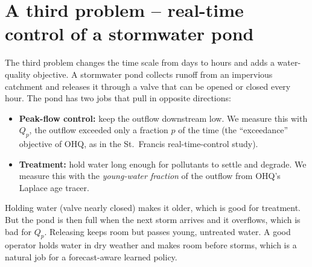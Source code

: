 \section{A third problem -- real-time control of a stormwater pond}\label{sec:pond}

The third problem changes the time scale from days to hours and adds a
water-quality objective. A stormwater pond collects runoff from an
impervious catchment and releases it through a valve that can be opened or
closed every hour. The pond has two jobs that pull in opposite directions:
\begin{itemize}\itemsep1pt
\item \textbf{Peak-flow control:} keep the outflow downstream low. We
measure this with $Q_p$, the outflow exceeded only a fraction $p$ of the
time (the ``exceedance'' objective of OHQ, as in the St.~Francis
real-time-control study).
\item \textbf{Treatment:} hold water long enough for pollutants to settle
and degrade. We measure this with the \emph{young-water fraction} of the
outflow from OHQ's Laplace age tracer.
\end{itemize}
Holding water (valve nearly closed) makes it older, which is good for
treatment. But the pond is then full when the next storm arrives and it
overflows, which is bad for $Q_p$. Releasing keeps room but passes young,
untreated water. A good operator holds water in dry weather and makes room
before storms, which is a natural job for a forecast-aware learned policy.

